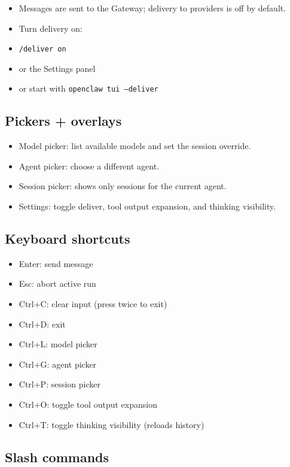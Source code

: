 \begin{itemize}
  \item Messages are sent to the Gateway; delivery to providers is off by default.
  \item Turn delivery on:
  \item \texttt{/deliver on}
  \item or the Settings panel
  \item or start with \texttt{openclaw tui --deliver}
\end{itemize}


\subsection{Pickers + overlays}


\begin{itemize}
  \item Model picker: list available models and set the session override.
  \item Agent picker: choose a different agent.
  \item Session picker: shows only sessions for the current agent.
  \item Settings: toggle deliver, tool output expansion, and thinking visibility.
\end{itemize}


\subsection{Keyboard shortcuts}


\begin{itemize}
  \item Enter: send message
  \item Esc: abort active run
  \item Ctrl+C: clear input (press twice to exit)
  \item Ctrl+D: exit
  \item Ctrl+L: model picker
  \item Ctrl+G: agent picker
  \item Ctrl+P: session picker
  \item Ctrl+O: toggle tool output expansion
  \item Ctrl+T: toggle thinking visibility (reloads history)
\end{itemize}


\subsection{Slash commands}


